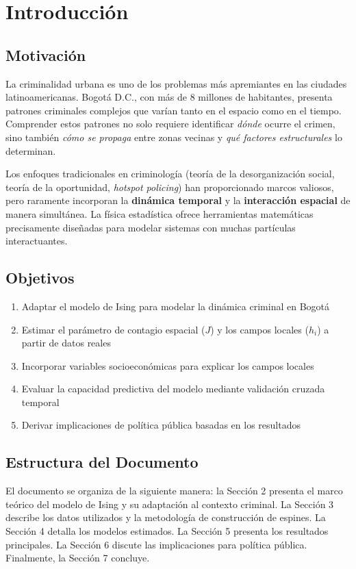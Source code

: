 \documentclass[12pt,a4paper]{article}
\begin{document}
\newpage
\tableofcontents
\newpage

\section{Introducción}

\subsection{Motivación}
La criminalidad urbana es uno de los problemas más apremiantes en las ciudades latinoamericanas. Bogotá D.C., con más de 8 millones de habitantes, presenta patrones criminales complejos que varían tanto en el espacio como en el tiempo. Comprender estos patrones no solo requiere identificar \textit{dónde} ocurre el crimen, sino también \textit{cómo se propaga} entre zonas vecinas y \textit{qué factores estructurales} lo determinan.

Los enfoques tradicionales en criminología (teoría de la desorganización social, teoría de la oportunidad, \textit{hotspot policing}) han proporcionado marcos valiosos, pero raramente incorporan la \textbf{dinámica temporal} y la \textbf{interacción espacial} de manera simultánea. La física estadística ofrece herramientas matemáticas precisamente diseñadas para modelar sistemas con muchas partículas interactuantes.

\subsection{Objetivos}
\begin{enumerate}[label=\alph*)]
    \item Adaptar el modelo de Ising para modelar la dinámica criminal en Bogotá
    \item Estimar el parámetro de contagio espacial ($J$) y los campos locales ($h_i$) a partir de datos reales
    \item Incorporar variables socioeconómicas para explicar los campos locales
    \item Evaluar la capacidad predictiva del modelo mediante validación cruzada temporal
    \item Derivar implicaciones de política pública basadas en los resultados
\end{enumerate}

\subsection{Estructura del Documento}
El documento se organiza de la siguiente manera: la Sección 2 presenta el marco teórico del modelo de Ising y su adaptación al contexto criminal. La Sección 3 describe los datos utilizados y la metodología de construcción de espines. La Sección 4 detalla los modelos estimados. La Sección 5 presenta los resultados principales. La Sección 6 discute las implicaciones para política pública. Finalmente, la Sección 7 concluye.
\end{document}
